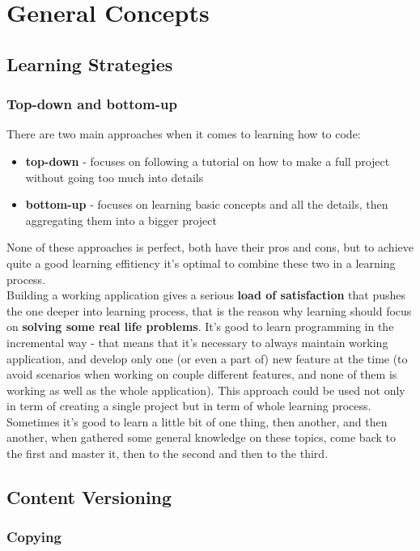 \part{General Concepts}

\chapter{Learning Strategies}

\section{Top-down and bottom-up}

There are two main approaches when it comes to learning how to code:
\begin{itemize}
\item \textbf{top-down} - focuses on following a tutorial on how to make a full project without going too much into details 
\item \textbf{bottom-up} - focuses on learning basic concepts and all the details, then aggregating them into a bigger project
\end{itemize}
None of these approaches is perfect, both have their pros and cons, but to achieve quite a good learning effitiency it's optimal to combine these two in a learning process.\\

Building a working application gives a serious \textbf{load of satisfaction} that pushes the one deeper into learning process, that is the reason why learning should focus on \textbf{solving some real life problems}. It's good to learn programming in the incremental way - that means that it's necessary to always maintain working application, and develop only one (or even a part of) new feature at the time (to avoid scenarios when working on couple different features, and none of them is working as well as the whole application). This approach could be used not only in term of creating a single project but in term of whole learning process. Sometimes it's good to learn a little bit of one thing, then another, and then another, when gathered some general knowledge on these topics, come back to the first and master it, then to the second and then to the third.

\chapter{Content Versioning}

\section{Copying}

